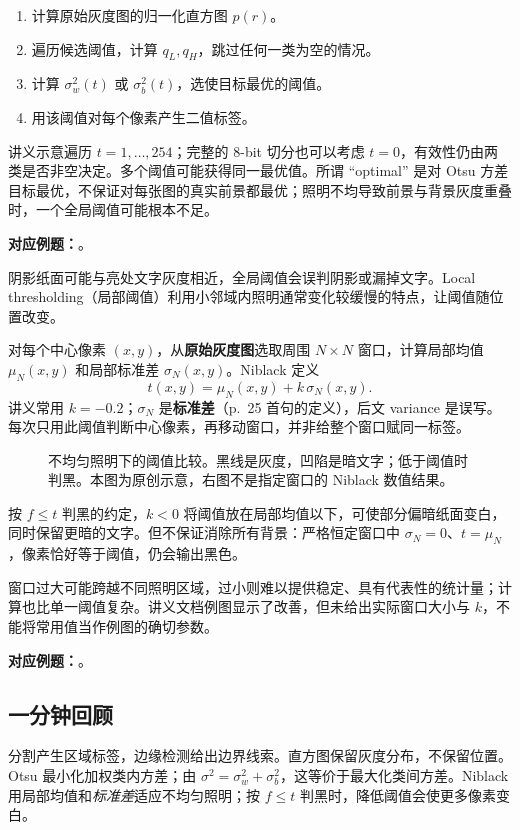 \begin{enumerate}
  \item 计算原始灰度图的归一化直方图 $p(r)$。
  \item 遍历候选阈值，计算 $q_L,q_H$，跳过任何一类为空的情况。
  \item 计算 $\sigma_w^2(t)$ 或 $\sigma_b^2(t)$，选使目标最优的阈值。
  \item 用该阈值对每个像素产生二值标签。
\end{enumerate}
讲义示意遍历 $t=1,\ldots,254$；完整的 8-bit 切分也可以考虑 $t=0$，有效性仍由两类是否非空决定。多个阈值可能获得同一最优值。所谓 ``optimal'' 是对 Otsu 方差目标最优，不保证对每张图的真实前景都最优；照明不均导致前景与背景灰度重叠时，一个全局阈值可能根本不足。

\textbf{对应例题：}。


阴影纸面可能与亮处文字灰度相近，全局阈值会误判阴影或漏掉文字。Local thresholding（局部阈值）利用小邻域内照明通常变化较缓慢的特点，让阈值随位置改变。

对每个中心像素 $(x,y)$，从\textbf{原始灰度图}选取周围 $N\times N$ 窗口，计算局部均值 $\mu_N(x,y)$ 和局部标准差 $\sigma_N(x,y)$。Niblack 定义
\[
  \boxed{t(x,y)=\mu_N(x,y)+k\,\sigma_N(x,y)}.
\]
讲义常用 $k=-0.2$；$\sigma_N$ 是\textbf{标准差}（p.~25 首句的定义），后文 variance 是误写。每次只用此阈值判断中心像素，再移动窗口，并非给整个窗口赋同一标签。

\begin{figure}[htbp]
  \centering
  \resizebox{0.98\textwidth}{!}{}
  \caption{不均匀照明下的阈值比较。黑线是灰度，凹陷是暗文字；低于阈值时判黑。本图为原创示意，右图不是指定窗口的 Niblack 数值结果。}
  \label{fig:sc4061-l07-global-local}
\end{figure}

按 $f\le t$ 判黑的约定，$k<0$ 将阈值放在局部均值以下，可使部分偏暗纸面变白，同时保留更暗的文字。但不保证消除所有背景：严格恒定窗口中 $\sigma_N=0$、$t=\mu_N$，像素恰好等于阈值，仍会输出黑色。

窗口过大可能跨越不同照明区域，过小则难以提供稳定、具有代表性的统计量；计算也比单一阈值复杂。讲义文档例图显示了改善，但未给出实际窗口大小与 $k$，不能将常用值当作例图的确切参数。

\textbf{对应例题：}。

\subsection{一分钟回顾}

分割产生区域标签，边缘检测给出边界线索。直方图保留灰度分布，不保留位置。Otsu 最小化加权类内方差；由 $\sigma^2=\sigma_w^2+\sigma_b^2$，这等价于最大化类间方差。Niblack 用局部均值和\emph{标准差}适应不均匀照明；按 $f\le t$ 判黑时，降低阈值会使更多像素变白。
